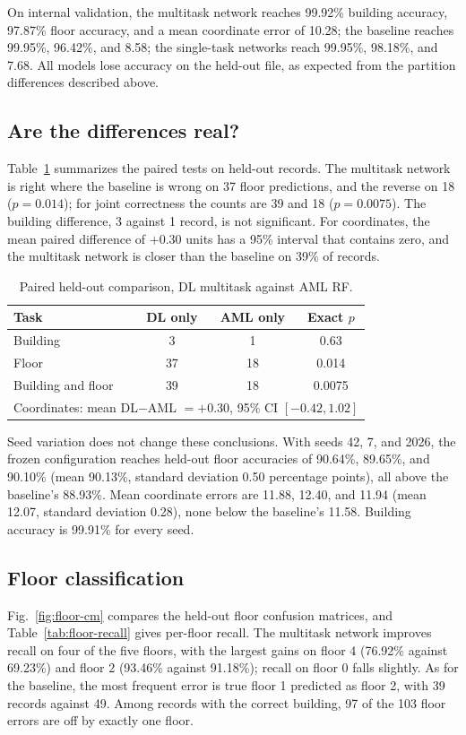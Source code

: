 \documentclass[conference]{IEEEtran}
\begin{document}
On internal validation, the multitask network reaches 99.92\% building accuracy, 97.87\% floor accuracy, and a mean coordinate error of 10.28; the baseline reaches 99.95\%, 96.42\%, and 8.58; the single-task networks reach 99.95\%, 98.18\%, and 7.68. All models lose accuracy on the held-out file, as expected from the partition differences described above.

\subsection{Are the differences real?}
Table~\ref{tab:paired} summarizes the paired tests on held-out records. The multitask network is right where the baseline is wrong on 37 floor predictions, and the reverse on 18 ($p=0.014$); for joint correctness the counts are 39 and 18 ($p=0.0075$). The building difference, 3 against 1 record, is not significant. For coordinates, the mean paired difference of $+0.30$ units has a 95\% interval that contains zero, and the multitask network is closer than the baseline on 39\% of records.

\begin{table}[!t]
\centering
\caption{Paired held-out comparison, DL multitask against AML RF.}
\label{tab:paired}
\small
\begin{tabular}{lccc}
\toprule
Task & DL only & AML only & Exact $p$ \\
\midrule
Building & 3 & 1 & 0.63 \\
Floor & 37 & 18 & 0.014 \\
Building and floor & 39 & 18 & 0.0075 \\
\midrule
\multicolumn{4}{l}{Coordinates: mean DL$-$AML $=+0.30$, 95\% CI $[-0.42, 1.02]$} \\
\bottomrule
\end{tabular}
\end{table}

Seed variation does not change these conclusions. With seeds 42, 7, and 2026, the frozen configuration reaches held-out floor accuracies of 90.64\%, 89.65\%, and 90.10\% (mean 90.13\%, standard deviation 0.50 percentage points), all above the baseline's 88.93\%. Mean coordinate errors are 11.88, 12.40, and 11.94 (mean 12.07, standard deviation 0.28), none below the baseline's 11.58. Building accuracy is 99.91\% for every seed.

\subsection{Floor classification}
Fig.~\ref{fig:floor-cm} compares the held-out floor confusion matrices, and Table~\ref{tab:floor-recall} gives per-floor recall. The multitask network improves recall on four of the five floors, with the largest gains on floor 4 (76.92\% against 69.23\%) and floor 2 (93.46\% against 91.18\%); recall on floor 0 falls slightly. As for the baseline, the most frequent error is true floor 1 predicted as floor 2, with 39 records against 49. Among records with the correct building, 97 of the 103 floor errors are off by exactly one floor.
\end{document}
